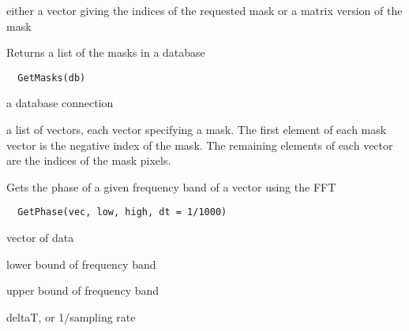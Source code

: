 \documentclass[a4paper]{book}
\begin{document}
%
\begin{Value}
either a vector giving the indices of the requested mask
or a matrix version of the mask
\end{Value}
%
\begin{Description}\relax
Returns a list of the masks in a database
\end{Description}
%
\begin{Usage}
\begin{verbatim}
  GetMasks(db)
\end{verbatim}
\end{Usage}
%
\begin{Arguments}
\begin{ldescription}
\item[\code{db}] a database connection
\end{ldescription}
\end{Arguments}
%
\begin{Value}
a list of vectors, each vector specifying a mask.  The
first element of each mask vector is the negative index
of the mask.  The remaining elements of each vector are
the indices of the mask pixels.
\end{Value}
%
\begin{Description}\relax
Gets the phase of a given frequency band of a vector
using the FFT
\end{Description}
%
\begin{Usage}
\begin{verbatim}
  GetPhase(vec, low, high, dt = 1/1000)
\end{verbatim}
\end{Usage}
%
\begin{Arguments}
\begin{ldescription}
\item[\code{vec}] vector of data

\item[\code{low}] lower bound of frequency band

\item[\code{high}] upper bound of frequency band

\item[\code{dt}] deltaT, or 1/sampling rate
\end{ldescription}
\end{Arguments}
\end{document}
